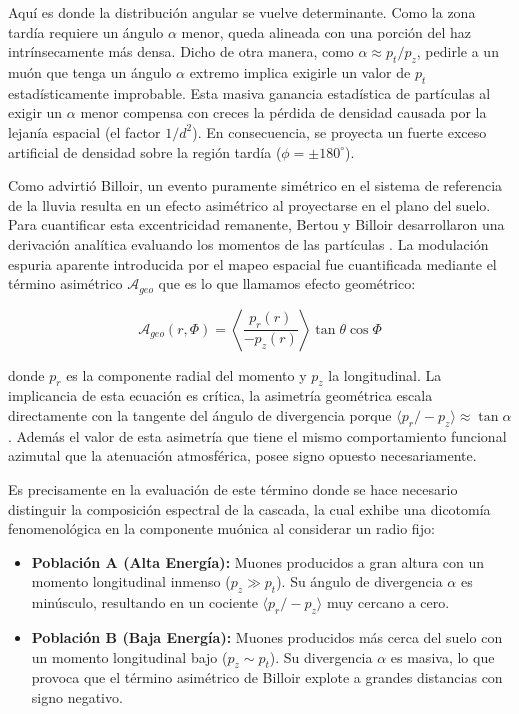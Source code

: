Aquí es donde la distribución angular se vuelve determinante. Como la zona tardía requiere un ángulo $\alpha$ menor, queda alineada con una porción del haz intrínsecamente más densa. Dicho de otra manera, como $\alpha \approx p_t / p_z$, pedirle a un muón que tenga un ángulo $\alpha$ extremo implica exigirle un valor de $p_t$ estadísticamente  improbable. Esta masiva ganancia estadística de partículas al exigir un $\alpha$ menor compensa con creces la pérdida de densidad causada por la lejanía espacial (el factor $1/d^2$). En consecuencia, se proyecta un fuerte exceso artificial de densidad sobre la región tardía ($\phi = \pm 180^\circ$).

Como advirtió Billoir, un evento puramente simétrico en el sistema de referencia de la lluvia resulta en un efecto asimétrico al proyectarse en el plano del suelo. Para cuantificar esta excentricidad remanente, Bertou y Billoir desarrollaron una derivación analítica evaluando los momentos de las partículas \cite{GAP2000_017}. La modulación espuria aparente introducida por el mapeo espacial fue cuantificada mediante el término asimétrico $\mathcal{A}_{geo}$ que es lo que llamamos efecto geométrico:

\begin{equation}
	\mathcal{A}_{geo}(r, \Phi) = \left\langle \frac{p_r(r)}{-p_z(r)} \right\rangle \tan \theta \cos \Phi
	\label{eq:efecto_geo}
\end{equation}

donde $p_r$ es la componente radial del momento y $p_z$ la longitudinal. La implicancia de esta ecuación es crítica, la asimetría geométrica escala directamente con la tangente del ángulo de divergencia porque $\langle p_r / -p_z \rangle \approx \tan \alpha$. Además el valor de esta asimetría que tiene el mismo comportamiento funcional azimutal que la atenuación atmosférica, posee signo opuesto necesariamente.

Es precisamente en la evaluación de este término donde se hace necesario distinguir la composición espectral de la cascada, la cual exhibe una dicotomía fenomenológica en la componente muónica al considerar un radio fijo:

\begin{itemize}
	\item \textbf{Población A (Alta Energía):} Muones producidos a gran altura con un momento longitudinal inmenso ($p_z \gg p_t$). Su ángulo de divergencia $\alpha$ es minúsculo, resultando en un cociente $\langle p_r / -p_z \rangle$ muy cercano a cero.
	\item \textbf{Población B (Baja Energía):} Muones producidos más cerca del suelo con un momento longitudinal bajo ($p_z \sim p_t$). Su divergencia $\alpha$ es masiva, lo que provoca que el término asimétrico de Billoir explote a grandes distancias con signo negativo.
\end{itemize}

